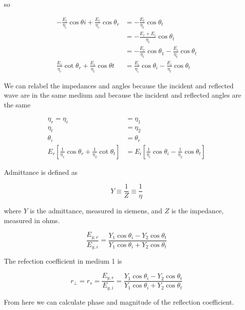 \documentclass[main.tex]{subfiles}
\begin{document}
\begin{enumerate}
\begin{enumerate}
        so
        
        $$
        \begin{aligned}
        -\frac{E_i}{\eta_i} \cos \theta i+\frac{E_r}{\eta_r} \cos \theta_r &=-\frac{E_t}{\eta_t} \cos \theta_t \\
        &=-\frac{E_r+E_i}{\eta_t} \cos \theta_t \\
        &=-\frac{E_r}{\eta_t} \cos \theta_1-\frac{E_i}{\eta_t} \cos \theta_t \\
        \frac{E_r}{\eta_r} \cot \theta_r+\frac{E_r}{\eta_t} \cos \theta t &= \frac{E_i}{\eta_i} \cos \theta_i-\frac{E_i}{\eta_t} \cos \theta_t
        \end{aligned}
        $$
        
         We can relabel the impedances and angles because the incident and reflected wave are in the same medium and because the incident and reflected angles are the same
        
        $$
        \begin{aligned}
        \eta_r=\eta_i&=\eta_1\\
        \eta_t &= \eta_2 \\
         \theta_i &= \theta_r\\
        E_r\left[\frac{1}{\eta_1} \cos \theta_r+\frac{1}{\eta_2} \cot \theta_t\right] &= E_i\left[\frac{1}{\eta_i} \cos \theta_i - \frac{1}{\eta_2} \cos \theta_t\right]
       
        \end{aligned}
        $$

        Admittance is defined as
        
        $$
        Y \equiv \frac{1}{Z} \equiv \frac{1}{\eta}
        $$
        
        where $Y$ is the admittance, measured in siemens, and $Z$ is the impedance, measured in ohms.
    
        $$
        \frac{E_{y,r}}{E_{y,i}} = \frac{ Y_1 \cos \theta_i - Y_2 \cos \theta_t}{Y_1 \cos \theta_i + Y_2 \cos \theta_t}
        $$
        
        The refection coefficient in medium 1 is
        
        $$
        r_{\perp} = r_s = \frac{E_{y,r}}{E_{y,i}} =\frac{ Y_1 \cos \theta_i - Y_2 \cos \theta_t}{Y_1 \cos \theta_i + Y_2 \cos \theta_t}
        $$
        
        From here we can calculate phase and magnitude of the reflection coefficient.
    
    \end{enumerate}

\end{enumerate}
\end{document}
